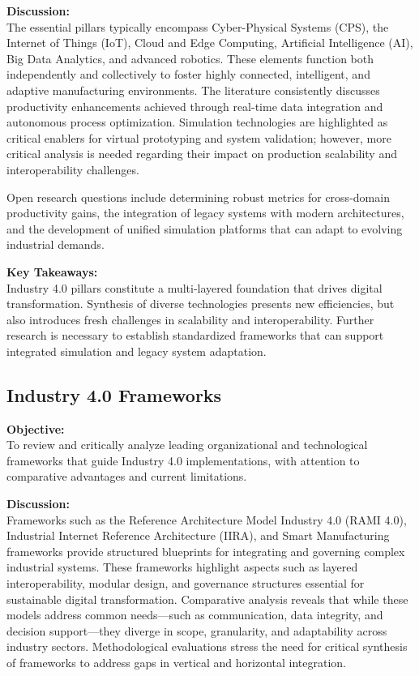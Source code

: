 \documentclass[sigconf]{acmart}
\begin{document}
\textbf{Discussion:}\\
The essential pillars typically encompass Cyber-Physical Systems (CPS), the Internet of Things (IoT), Cloud and Edge Computing, Artificial Intelligence (AI), Big Data Analytics, and advanced robotics. These elements function both independently and collectively to foster highly connected, intelligent, and adaptive manufacturing environments. The literature consistently discusses productivity enhancements achieved through real-time data integration and autonomous process optimization. Simulation technologies are highlighted as critical enablers for virtual prototyping and system validation; however, more critical analysis is needed regarding their impact on production scalability and interoperability challenges.

Open research questions include determining robust metrics for cross-domain productivity gains, the integration of legacy systems with modern architectures, and the development of unified simulation platforms that can adapt to evolving industrial demands.

\textbf{Key Takeaways:}\\
Industry 4.0 pillars constitute a multi-layered foundation that drives digital transformation. Synthesis of diverse technologies presents new efficiencies, but also introduces fresh challenges in scalability and interoperability. Further research is necessary to establish standardized frameworks that can support integrated simulation and legacy system adaptation.

\subsection{Industry 4.0 Frameworks}
\textbf{Objective:}\\
To review and critically analyze leading organizational and technological frameworks that guide Industry 4.0 implementations, with attention to comparative advantages and current limitations.

\textbf{Discussion:}\\
Frameworks such as the Reference Architecture Model Industry 4.0 (RAMI 4.0), Industrial Internet Reference Architecture (IIRA), and Smart Manufacturing frameworks provide structured blueprints for integrating and governing complex industrial systems. These frameworks highlight aspects such as layered interoperability, modular design, and governance structures essential for sustainable digital transformation. Comparative analysis reveals that while these models address common needs—such as communication, data integrity, and decision support—they diverge in scope, granularity, and adaptability across industry sectors. Methodological evaluations stress the need for critical synthesis of frameworks to address gaps in vertical and horizontal integration.
\end{document}
